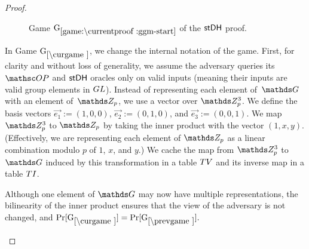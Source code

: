 \begin{proof}
\begin{figure}[tp]
		\caption[]{%
			Game $\lblGm{ggm-start}$ of the $\mathsf{stDH}$ proof.
		}
		\label{fig:GGM-proof:game:start}
	\end{figure}
In Game $\curGm*$, we change the internal notation of the game.
First, for clarity and without loss of generality, we assume the adversary queries its $\OP$ and $\mathsf{stDH}$ oracles only on valid inputs (meaning their inputs are valid group elements in $GL$).
Instead of representing each element of~$\group$ with an element of~$\ZZ_p$, we use a vector over $\ZZ_p^3$.
We define the basis vectors $\vec{e_1} := (1,0,0)$, $\vec{e_2} := (0,1,0)$, and $\vec{e_3} := (0,0,1)$.
We map  $\ZZ_p^{3}$ to $\ZZ_p$ by taking the inner product with the vector $(1,x,y)$.
(Effectively, we are representing each element of $\ZZ_p$ as a linear combination modulo $p$ of $1$, $x$, and $y$.)
We cache the map from $\ZZ_p^3$ to $\group$ induced by this transformation in a table $TV$ and its inverse map in a table $TI$.

Although one element of $\group$ may now have multiple representations, the bilinearity of the inner product ensures that the view of the adversary is not changed, and $\Pr[\curGm* ] = \Pr[\prevGm* ].$

\begin{figure}[tp]
	\begin{minipage}[t]{0.49\textwidth}
		
		\ExptSepSpace
		

\end{minipage}
\end{figure}
\end{proof}
